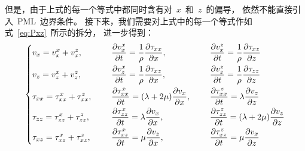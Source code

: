 \documentclass[UTF8]{ctexart}
\begin{document}
但是，由于上式的每一个等式中都同时含有对~$x$~和~$z$~的偏导，
依然不能直接引入~PML~边界条件。
接下来，我们需要对上式中的每一个等式作如式~\eqref{eq:Pxz}~所示的拆分，
进一步得到：
\begin{equation}
\left\{ \begin{aligned}
& v_x=v_x^x+v_x^z, & \hspace{5mm} & \frac{\partial v_x^x}{\partial t}=\frac{1}{\rho}\frac{\partial \tau_{xx}}{\partial x}, & \hspace{5mm} & \frac{\partial v_x^z}{\partial t}=\frac{1}{\rho}\frac{\partial \tau_{xz}}{\partial z} \\
& v_z=v_z^x+v_z^z, & \hspace{5mm} & \frac{\partial v_z^x}{\partial t}=\frac{1}{\rho}\frac{\partial \tau_{xz}}{\partial x}, & \hspace{5mm} & \frac{\partial v_z^z}{\partial t}=\frac{1}{\rho}\frac{\partial \tau_{zz}}{\partial z} \\
& \tau_{xx}=\tau_{xx}^x+\tau_{xx}^z, & \hspace{5mm} & \frac{\partial \tau_{xx}^x}{\partial t}=(\lambda+2\mu)\frac{\partial v_x}{\partial x}, & \hspace{5mm} & \frac{\partial \tau_{xx}^z}{\partial t}=\lambda\frac{\partial v_z}{\partial z} \\
& \tau_{zz}=\tau_{zz}^x+\tau_{zz}^z, & \hspace{5mm} & \frac{\partial \tau_{zz}^x}{\partial t}=\lambda\frac{\partial v_x}{\partial x}, & \hspace{5mm} & \frac{\partial \tau_{zz}^z}{\partial t}=(\lambda+2\mu)\frac{\partial v_z}{\partial z} \\
& \tau_{xz}=\tau_{xz}^x+\tau_{xz}^z, & \hspace{5mm} & \frac{\partial \tau_{xz}^x}{\partial t}=\mu\frac{\partial v_z}{\partial x}, & \hspace{5mm} & \frac{\partial \tau_{xz}^z}{\partial t}=\mu\frac{\partial v_x}{\partial z}
\end{aligned} \right.
\end{equation}
\end{document}
